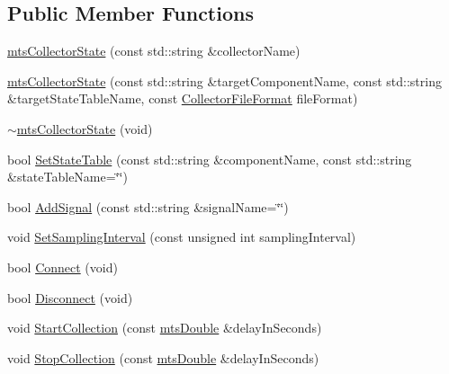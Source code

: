 \subsection*{Public Member Functions}
\begin{DoxyCompactItemize}
\item 
\hyperlink{classmts_collector_state_a34e1c33ed253cea0354e789c821ce68f}{mts\-Collector\-State} (const std\-::string \&collector\-Name)
\item 
\hyperlink{classmts_collector_state_a32fc978a0d303bad899e0f7c6927d41c}{mts\-Collector\-State} (const std\-::string \&target\-Component\-Name, const std\-::string \&target\-State\-Table\-Name, const \hyperlink{classmts_collector_base_aa228bed8144053d0bfa316f9ac9d0901}{Collector\-File\-Format} file\-Format)
\item 
\hyperlink{classmts_collector_state_a8cf49acf351f722426e9702661041d7e}{$\sim$mts\-Collector\-State} (void)
\item 
bool \hyperlink{classmts_collector_state_a984a05c6362c5e9e9bf87da923f67893}{Set\-State\-Table} (const std\-::string \&component\-Name, const std\-::string \&state\-Table\-Name=\char`\"{}\char`\"{})
\item 
bool \hyperlink{classmts_collector_state_ad040a83bd440b0b9b26f513a418cdad9}{Add\-Signal} (const std\-::string \&signal\-Name=\char`\"{}\char`\"{})
\item 
void \hyperlink{classmts_collector_state_a167a95911da734754db0abeeacaa15cc}{Set\-Sampling\-Interval} (const unsigned int sampling\-Interval)
\item 
bool \hyperlink{classmts_collector_state_aff201d6644d0b997961833e9ef025343}{Connect} (void)
\item 
bool \hyperlink{classmts_collector_state_ac1d62769aedb2fab6cec2eca161eb06c}{Disconnect} (void)
\end{DoxyCompactItemize}
{\bf }\par
\begin{DoxyCompactItemize}
\item 
void \hyperlink{classmts_collector_state_a4337bf2b019fb0516abfe5faadbac5f5}{Start\-Collection} (const \hyperlink{mts_generic_object_proxy_8h_a31e76b0190a8d3f9838626cd7b47bd75}{mts\-Double} \&delay\-In\-Seconds)
\item 
void \hyperlink{classmts_collector_state_a8da41d4b23bbb42f9f74ee32fecf36ec}{Stop\-Collection} (const \hyperlink{mts_generic_object_proxy_8h_a31e76b0190a8d3f9838626cd7b47bd75}{mts\-Double} \&delay\-In\-Seconds)
\end{DoxyCompactItemize}

